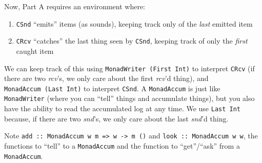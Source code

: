 \documentclass[]{article}
\newenvironment{Shaded}{}{}
\newcommand{\CommentTok}[1]{\textcolor[rgb]{0.38,0.63,0.69}{\textit{#1}}}
\newcommand{\DataTypeTok}[1]{\textcolor[rgb]{0.56,0.13,0.00}{#1}}
\newcommand{\DecValTok}[1]{\textcolor[rgb]{0.25,0.63,0.44}{#1}}
\newcommand{\FunctionTok}[1]{\textcolor[rgb]{0.02,0.16,0.49}{#1}}
\newcommand{\KeywordTok}[1]{\textcolor[rgb]{0.00,0.44,0.13}{\textbf{#1}}}
\newcommand{\NormalTok}[1]{#1}
\newcommand{\OtherTok}[1]{\textcolor[rgb]{0.00,0.44,0.13}{#1}}
\begin{document}
Now, Part A requires an environment where:

\begin{enumerate}
\def\labelenumi{\arabic{enumi}.}
\tightlist
\item
  \texttt{CSnd} ``emits'' items (as sounds), keeping track only of the
  \emph{last} emitted item
\item
  \texttt{CRcv} ``catches'' the last thing seen by \texttt{CSnd}, keeping track
  of only the \emph{first} caught item
\end{enumerate}

We can keep track of this using \texttt{MonadWriter\ (First\ Int)} to interpret
\texttt{CRcv} (if there are two \emph{rcv}'s, we only care about the first
\emph{rcv}'d thing), and \texttt{MonadAccum\ (Last\ Int)} to interpret
\texttt{CSnd}. A \texttt{MonadAccum} is just like \texttt{MonadWriter} (where
you can ``tell'' things and accumulate things), but you also have the ability to
read the accumulated log at any time. We use \texttt{Last\ Int} because, if
there are two \emph{snd}'s, we only care about the last \emph{snd}'d thing.

\begin{Shaded}
\end{Shaded}

Note
\texttt{add\ ::\ MonadAccum\ w\ m\ =\textgreater{}\ w\ -\textgreater{}\ m\ ()}
and \texttt{look\ ::\ MonadAccum\ w\ w}, the functions to ``tell'' to a
\texttt{MonadAccum} and the function to ``get''/``ask'' from a
\texttt{MonadAccum}.
\end{document}
